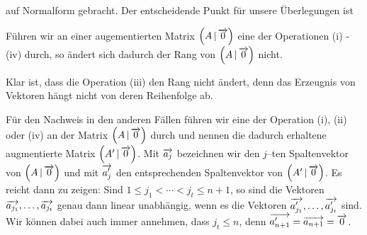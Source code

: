 auf Normalform gebracht. Der entscheidende Punkt für unsere \"Uberlegungen ist

\begin{lemma}\label{rg_equ_operation} 
Führen wir an einer augementierten Matrix 
$\left(A \, \vert \, \overrightarrow{0}\right)$ eine der Operationen (i) - (iv) 
durch, so ändert sich dadurch der Rang von $\left(A \, \vert \, 
\overrightarrow{0}\right)$ nicht.
\end{lemma}

\beweis Klar ist, dass die Operation (iii) den Rang nicht ändert, denn das Erzeugnis 
von Vektoren hängt nicht von deren Reihenfolge ab. 

Für den Nachweis in den anderen Fällen führen wir eine der Operation (i), (ii) 
oder (iv) an der Matrix $\left(A \, \vert \, \overrightarrow{0}\right)$ durch und 
nennen die dadurch erhaltene augmentierte Matrix
$\left(A' \, \vert \, \overrightarrow{0}\right)$. Mit $\overrightarrow{a_j}$ bezeichnen 
wir den $j$--ten Spaltenvektor von $\left(A \, \vert \, \overrightarrow{0}\right)$ und 
mit $\overrightarrow{a^{\prime}_j}$ den entsprechenden Spaltenvektor von 
$\left(A' \, \vert \, \overrightarrow{0}\right)$. Es reicht dann zu zeigen:
Sind $1 \leq j_1 < \cdots < j_t \leq n+1$, so sind die Vektoren 
$\overrightarrow{a_{j_1}}, \ldots , \overrightarrow{a_{j_t}}$ genau dann linear 
unabhängig, wenn es die Vektoren $\overrightarrow{a^{\prime}_{j_1}}, \ldots , 
\overrightarrow{a^{\prime}_{j_t}}$ sind. Wir können dabei auch immer annehmen, 
dass $j_t \leq n$, denn $\overrightarrow{a^{\prime}_{n+1}} = \overrightarrow{a_{n+1}} 
= \overrightarrow{0}$.

